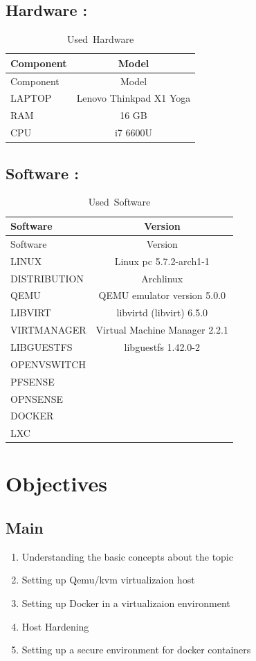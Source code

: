 \documentclass[
  14pt,
  english,
  a4paper,
]{scrreprt}
\providecommand{\tightlist}{%
  \setlength{\itemsep}{0pt}\setlength{\parskip}{0pt}}
\begin{document}
\hypertarget{hardware}{%
\subsection{Hardware :}\label{hardware}}

\hypertarget{tbl:Used_Hardware}{}
\begin{longtable}[]{@{}lc@{}}
\caption{\label{tbl:Used_Hardware}Used~Hardware}\tabularnewline
\toprule
Component & Model\tabularnewline
\midrule
\endfirsthead
\toprule
Component & Model\tabularnewline
\midrule
\endhead
LAPTOP & Lenovo Thinkpad X1 Yoga\tabularnewline
RAM & 16 GB\tabularnewline
CPU & i7 6600U\tabularnewline
\bottomrule
\end{longtable}

\hypertarget{software}{%
\subsection{Software :}\label{software}}

\hypertarget{tbl:used_software}{}
\begin{longtable}[]{@{}lc@{}}
\caption{\label{tbl:used_software}Used~Software}\tabularnewline
\toprule
Software & Version\tabularnewline
\midrule
\endfirsthead
\toprule
Software & Version\tabularnewline
\midrule
\endhead
LINUX & Linux pc 5.7.2-arch1-1\tabularnewline
DISTRIBUTION & Archlinux\tabularnewline
QEMU & QEMU emulator version 5.0.0\tabularnewline
LIBVIRT & libvirtd (libvirt) 6.5.0\tabularnewline
VIRTMANAGER & Virtual Machine Manager 2.2.1\tabularnewline
LIBGUESTFS & libguestfs 1.42.0-2\tabularnewline
OPENVSWITCH &\tabularnewline
PFSENSE &\tabularnewline
OPNSENSE &\tabularnewline
DOCKER &\tabularnewline
LXC &\tabularnewline
\bottomrule
\end{longtable}

\hypertarget{objectives}{%
\section{Objectives}\label{objectives}}

\hypertarget{main}{%
\subsection{Main}\label{main}}

\begin{enumerate}
\def\labelenumi{\arabic{enumi}.}
\tightlist
\item
  Understanding the basic concepts about the topic
\item
  Setting up Qemu/kvm virtualizaion host
\item
  Setting up Docker in a virtualizaion environment
\item
  Host Hardening
\item
  Setting up a secure environment for docker containers
\end{enumerate}
\end{document}
